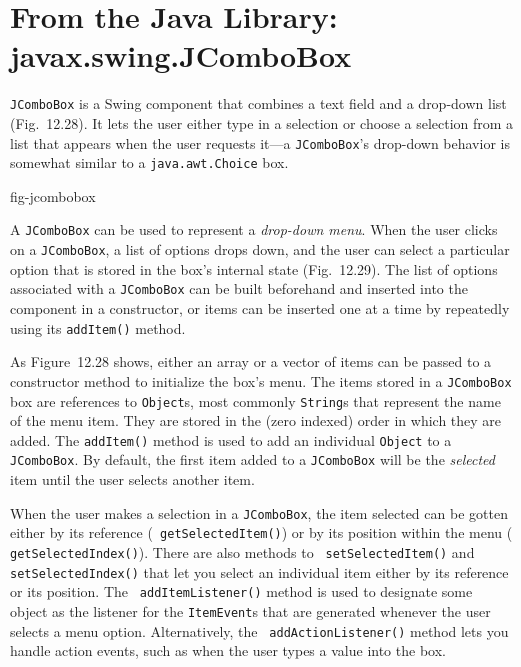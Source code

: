 \section{From the Java Library: \\ javax.swing.JComboBox}

 {\tt JComboBox} is a Swing component that combines a text field and
a drop-down list (Fig.~12.28).  It lets the user either
type in a selection or choose a selection from a list that appears
when the user requests it---a {\tt JComboBox}'s drop-down behavior is
somewhat similar to a {\tt java.awt.Choice} box.


{fig-jcombobox}

A {\tt JComboBox} can be used to represent a {\it drop-down menu}.
When the user clicks on a {\tt JComboBox}, a list of options drops
down, and the user can select a particular option that is stored in
the box's internal state (Fig.~12.29).  The list of
options associated with a {\tt JComboBox} can be built beforehand and
inserted into the component in a constructor, or items can be inserted
one at a time by repeatedly using its {\tt addItem()} method.

As Figure~12.28 shows, either an array or a vector of items
can be passed to a constructor method to initialize the box's menu.
The items stored in a {\tt JComboBox} box are references to
{\tt Object}s, most commonly {\tt String}s that represent the name of the
menu item.  They are stored in the (zero indexed) order in which they
are added.   The {\tt addItem()} method is used to add an individual
{\tt Object} to a {\tt JComboBox}.  By default, the first item added
to a {\tt JComboBox} will be the {\it selected} item until the user
selects another item.

When the user makes a selection in a {\tt JComboBox}, the item
selected can be gotten either by its reference ({\tt
getSelectedItem()}) or by its position within the menu ({\tt
getSelectedIndex()}).  There are also methods to {\tt
set\-SelectedItem()} and {\tt setSelectedIndex()} that let you select
an individual item either by its reference or its position.  The {\tt
addItemListener()} method is used to designate some object as the
listener for the {\tt ItemEvent}s that are generated whenever the user
selects a menu option.  Alternatively, the \mbox{\tt
addActionListener()} method lets you handle action events, such as
when the user types a value into the box.

